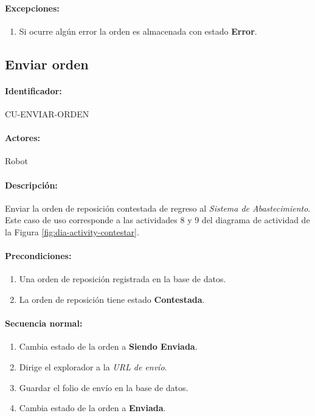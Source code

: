 \paragraph{Excepciones:}
\begin{enumerate}
  \item Si ocurre algún error la orden es almacenada con estado \textbf{Error}.
\end{enumerate}


\subsection{Enviar orden}\label{cu-enviar-orden}
\paragraph{Identificador:}
CU-ENVIAR-ORDEN
\paragraph{Actores:}
Robot
\paragraph{Descripción:}
Enviar la orden de reposición contestada de regreso al \textit{Sistema de Abastecimiento}. Este caso de uso corresponde a las actividades 8 y 9 del diagrama de actividad de la Figura \ref{fig:dia-activity-contestar}.
\paragraph{Precondiciones:}
\begin{enumerate}
  \item Una orden de reposición registrada en la base de datos.
  \item La orden de reposición tiene estado \textbf{Contestada}.
\end{enumerate}
\paragraph{Secuencia normal:}
\begin{enumerate}
  \item Cambia estado de la orden a \textbf{Siendo Enviada}.
  \item Dirige el explorador a la \textit{URL de envío}.
  \item Guardar el folio de envío en la base de datos.
  \item Cambia estado de la orden a \textbf{Enviada}.
\end{enumerate}
